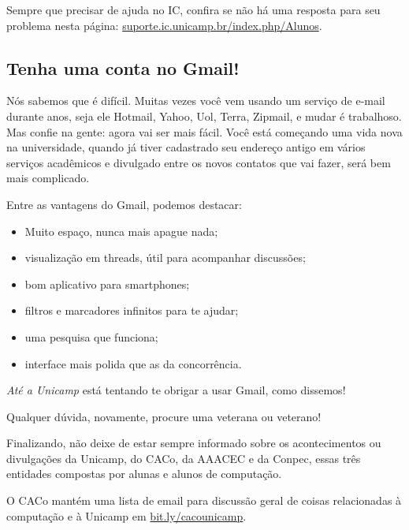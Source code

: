 Sempre que precisar de ajuda no IC, confira se não há uma resposta para seu
problema nesta página: \url{suporte.ic.unicamp.br/index.php/Alunos}.


\subsection{Tenha uma conta no Gmail!}

Nós sabemos que é difícil. Muitas vezes você vem usando um serviço de e-mail
durante anos, seja ele Hotmail, Yahoo, Uol, Terra, Zipmail, e mudar é
trabalhoso. Mas confie na gente: agora vai ser mais fácil. Você está começando
uma vida nova na universidade, quando já tiver cadastrado seu endereço antigo
em vários serviços acadêmicos e divulgado entre os novos contatos que vai
fazer, será bem mais complicado.

Entre as vantagens do Gmail, podemos destacar:

\begin{itemize}
    \item Muito espaço, nunca mais apague nada;
    \item visualização em threads, útil para acompanhar discussões;
    \item bom aplicativo para smartphones;
    \item filtros e marcadores infinitos para te ajudar;
    \item uma pesquisa que funciona;
    \item interface mais polida que as da concorrência.
\end{itemize}

\emph{Até a Unicamp} está tentando te obrigar a usar Gmail, como dissemos!
\shrug

Qualquer dúvida, novamente, procure uma veterana ou veterano!

Finalizando, não deixe de estar sempre informado sobre os acontecimentos ou
divulgações da Unicamp, do CACo, da AAACEC e da Conpec, essas três entidades
compostas por alunas e alunos de computação.

O CACo mantém uma lista de email para discussão geral de coisas relacionadas à
computação e à Unicamp em \url{bit.ly/cacounicamp}.
